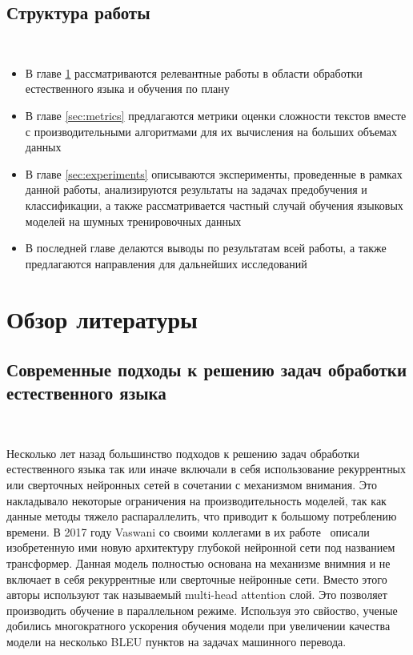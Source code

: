 \documentclass{spbau-diploma}
\begin{document}
\subsection*{Структура работы}
\ 

\begin{itemize}
	\item В главе \ref{sec:literature} рассматриваются релевантные работы в области обработки естественного языка и обучения по плану
	\item В главе \ref{sec:metrics} предлагаются метрики оценки сложности текстов вместе с производительными алгоритмами для их вычисления на больших объемах данных
	\item В главе \ref{sec:experiments} описываются эксперименты, проведенные в рамках данной работы, анализируются результаты на задачах предобучения и классификации, а также рассматривается частный случай обучения языковых моделей на шумных тренировочных данных
	\item В последней главе делаются выводы по результатам всей работы, а также предлагаются направления для дальнейших исследований
\end{itemize}

\section{Обзор литературы} \label{sec:literature}
\subsection{Современные подходы к решению задач обработки естественного языка}
\ 

Несколько лет назад большинство подходов к решению задач обработки естественного языка так или иначе включали в себя использование рекуррентных или сверточных нейронных сетей в сочетании с механизмом внимания. Это накладывало некоторые ограничения на производительность моделей, так как данные методы тяжело распараллелить, что приводит к большому потреблению времени. В 2017 году Vaswani со своими коллегами в их работе~\cite{vaswani2017attention} описали изобретенную ими новую архитектуру глубокой нейронной сети под названием трансформер. Данная модель полностью основана на механизме внимния и не включает в себя рекуррентные или сверточные нейронные сети. Вместо этого авторы используют так называемый multi-head attention слой. Это позволяет производить обучение в параллельном режиме. Используя это свйоство, ученые добились многократного ускорения обучения модели при увеличении качества модели на несколько BLEU пунктов на задачах машинного перевода.
\end{document}
